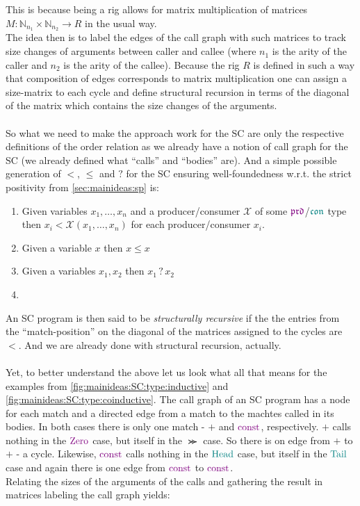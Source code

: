This is because being a rig allows for matrix multiplication of matrices $M : \mathbb{N}_{n_{1}} \times \mathbb{N}_{n_{2}} \to R$ in the usual way.
\\
The idea then is to label the edges of the call graph with such matrices to track size changes of arguments between caller and callee (where $n_{1}$ is the arity of the caller and $n_{2}$ is the arity of the callee).
Because the rig $R$ is defined in such a way that composition of edges corresponds to matrix multiplication one can assign a size-matrix to each cycle and define structural recursion in terms of the diagonal of the matrix which contains the size changes of the arguments.
\\
\\
So what we need to make the approach work for the SC are only the respective definitions of the order relation as we already have a notion of call graph for the SC (we already defined what \enquote{calls} and \enquote{bodies} are).
And a simple possible generation of $<$, $\leq$ and $?$ for the SC ensuring well-foundedness w.r.t. the strict positivity from \cref{sec:mainideas:sp} is:
\begin{enumerate}
  \item
    Given variables $x_{1},\ldots,x_{n}$ and a producer/consumer $\mathcal{X}$ of some $\polprd$/$\polcon$ type then $x_{i} < \mathcal{X}(x_{1},\ldots,x_{n})$ for each producer/consumer $x_{i}$.
  \item
    Given a variable $x$ then $x \leq x$
  \item
    Given a variables $x_{1},x_{2}$ then $x_{1} \, ? \, x_{2}$
  \item
\end{enumerate}
An SC program is then said to be \textit{structurally recursive} if the the entries from the \enquote{match-position} on the diagonal of the matrices assigned to the cycles are $<$.
And we are already done with structural recursion, actually.
\\
\\
Yet, to better understand the above let us look what all that means for the examples from \cref{fig:mainideas:SC:type:inductive} and \cref{fig:mainideas:SC:type:coinductive}.
The call graph of an SC program has a node for each match and a directed edge from a match to the machtes called in its bodies.
In both cases there is only one match - $\plus$ and $\const$, respectively.
$\plus$ calls nothing in the $\Zero$ case, but itself in the $\Succ$ case.
So there is on edge from $\plus$ to $\plus$ - a cycle.
Likewise, $\const$ calls nothing in the $\Head$ case, but itself in the $\Tail$ case and again there is one edge from $\const$ to $\const$.
\\
Relating the sizes of the arguments of the calls and gathering the result in matrices labeling the call graph yields:

